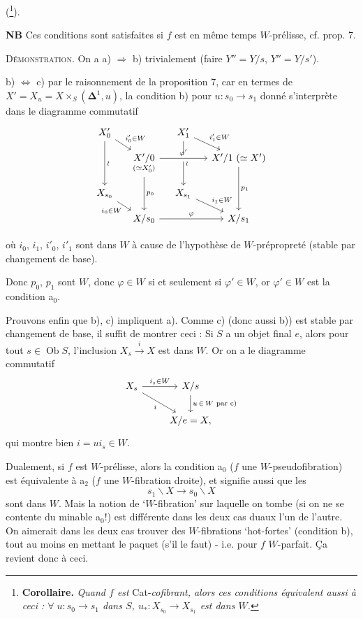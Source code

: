\documentclass[11pt]{article}
\newcommand{\printedpage}[1]{\marginpar{\footnotesize p.~#1}}
\newcommand{\msp}[1]{\marginpar{\footnotesize [#1]}}
\newcommand{\Ob}{\operatorname{Ob}}
\newcommand{\fl}{\longrightarrow}
\begin{document}
(\footnote[49]{\textbf{Corollaire.} \textit{Quand $f$ est} Cat-\textit{cofibrant, alors ces conditions équivalent aussi à ceci : $\forall\; u : s_0\fl s_1$ dans $S$, $u_* : X_{s_0}\fl X_{s_1}$ est dans $W$.}}).

\printedpage{31}
\textbf{NB} Ces conditions sont satisfaites si $f$ est en même temps $W$-prélisse, cf. prop. 7.

\textsc{Démonstration}. On a a) $\Longrightarrow$ b) trivialement (faire $Y''=Y/s$, $Y''=Y/s'$).

b) $\Longleftrightarrow$ c) par le raisonnement de la proposition 7, car en termes de $X'=X_u=X\times_S(\boldsymbol{\Delta}^1,u)$, la condition b) pour $u : s_0\fl s_1$ donné s'interprète dans le diagramme commutatif
\[
\begin{tikzcd}[column sep=small, row sep=small]
X'_0 \arrow[dr, "i'_0\in W"] \arrow[dd, "\wr"] & & X'_1 \arrow[dr, "i'_1\in W"] \arrow[dd, "\wr"] & \\
 & \underset{(\simeq X'_0)}{X'/0} \arrow[rr, "\varphi'", crossing over] \arrow[dd, "p_0"] & & X'/1\ (\simeq X') \arrow[dd, "p_1"] \\
X_{s_0} \arrow[dr, "i_0\in W"'] & & X_{s_1} \arrow[dr, "i_1\in W"] & \\
 & X/s_0 \arrow[rr, "\varphi"] & & X/s_1
\end{tikzcd}
\]

 où $i_0$, $i_1$, $i'_0$, $i'_1$ sont dans $W$ à cause de l'hypothèse de $W$-prépropreté (stable par changement de base).

Donc $p_0$, $p_1$ sont $W$, donc $\varphi\in W$ si et seulement si $\varphi'\in W$, or $\varphi'\in W$ est la condition a$_0$.

\msp{page 42}Prouvons enfin que b), c) impliquent a). Comme c) (donc aussi b)) est stable par changement de base, il suffit de montrer ceci : Si $S$ a un objet final $e$, alors pour tout $s\in\Ob S$, l'inclusion $X_s\xrightarrow{\ i\ }X$ est dans $W$. Or on a le diagramme commutatif
\[
\begin{tikzcd}
X_s \arrow[r, "i_s\in W"] \arrow[dr, "i"'] & X/s \arrow[d, "u\,\in\,W\text{ par c) }"] \\
 & X/e=X,
\end{tikzcd}
\]
qui montre bien $i=ui_s\in W$.

Dualement, si $f$ est $W$-prélisse, alors la condition a$_0$ ($f$ une $W$-pseudofibration) est équivalente à a$_2$ ($f$ une $W$-fibration droite), et signifie aussi que les
\[ s_1\backslash X\fl s_0\backslash X \]
sont dans $W$. Mais la notion de ‘$W$-fibration’ sur laquelle on tombe (si on ne se contente du minable a$_0$!) est différente dans les deux cas duaux l'un de l'autre. On aimerait dans les deux cas trouver des $W$-fibrations ‘hot-fortes’ (condition b), tout au moins en mettant le paquet (s'il le faut) - i.e. pour $f$ $W$-parfait. Ça revient donc à ceci.
\end{document}
